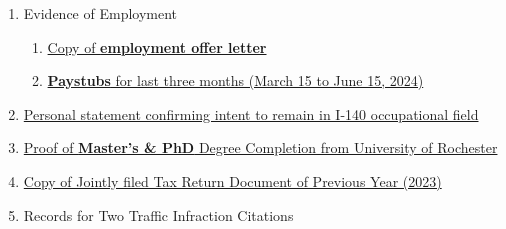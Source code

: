 \begin{enumerate}[label=\textbf{ Exhibit-\arabic*}]
    \item Evidence of Employment
    \begin{enumerate}[label=\roman*.]
        \item \hyperref[exhibit9a]{Copy of \textbf{employment offer letter}}
        \item \hyperref[exhibit9b]{\textbf{Paystubs} for last three months (March 15 to June 15, 2024)}
    \end{enumerate}
    
    \item \hyperref[exhibit10]{Personal statement confirming intent to remain in I-140 occupational field}
    
    \item \hyperref[exhibit11]{Proof of \textbf{Master’s \& PhD} Degree Completion from University of Rochester}
    

    \item \hyperref[exhibit_tax_2023]{Copy of Jointly filed Tax Return Document of Previous Year (2023)}

    \item Records for Two Traffic Infraction Citations
    



\end{enumerate}
